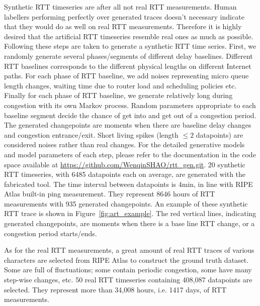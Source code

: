 Synthetic RTT timeseries are after all not real RTT measurements.
Human labellers performing perfectly over generated traces doesn't necessary indicate that they would do as well on real RTT measurements.
Therefore it is highly desired that the artificial RTT timeseries resemble real ones as much as possible.
Following these steps are taken to generate a synthetic RTT time series.
First, we randomly generate several phases/segments of different delay baselines.
Different RTT baselines corresponds to the different physical lengths on different Internet paths.
For each phase of RTT baseline, we add noises representing micro queue length changes, waiting time due to router load and scheduling policies etc.
Finally for each phase of RTT baseline, we generate relatively long during congestion with its own Markov process.
Random parameters appropriate to each baseline segment decide the chance of get into and get out of a congestion period.
The generated changepoints are moments when there are baseline delay changes and congestion entrance/exit.
Short living spikes (length $\leq 2$ datapoints) are considered noises rather than real changes.
For the detailed generative models and model parameters of each step, please refer to the documentation in the code space available at \url{https://github.com/WenqinSHAO/rtt_gen.git}.
20 synthetic RTT timeseries, with 6485 datapoints each on average, are generated with the fabricated tool.
The time interval between datapoints is 4min, in line with RIPE Atlas built-in ping measurement.
They represent 8646 hours of RTT measurements with 935 generated changepoints.
An example of these synthetic RTT trace is shown in Figure~\ref{fig:art_example}.
The red vertical lines, indicating generated changepoints, are moments when there is a base line RTT change, or a congestion period starts/ends.

As for the real RTT measurements, a great amount of real RTT traces of various characters are selected from RIPE Atlas to construct the ground truth dataset.
Some are full of fluctuations; some contain periodic congestion, some have many step-wise changes, etc.
50 real RTT timeseries containing 408,087 datapoints are selected.
They represent more than 34,008 hours, i.e. 1417 days, of RTT measurements. 

